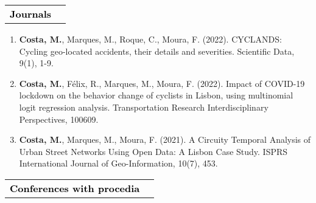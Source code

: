 \vspace{7pt}

\vspace{7pt}\hspace{-5pt}
\begin{tabular*}{1\textwidth}{p{} p{}}
        \textcolor{black}{\Large\textbf{Journals}} & \\
    \end{tabular*}
\begin{enumerate}[rightmargin=1.5cm]
\itemsep0em 
\item \textbf{Costa, M.}, Marques, M., Roque, C., Moura, F. (2022). CYCLANDS: Cycling geo-located accidents, their details and severities. Scientific Data, 9(1), 1-9.

\item \textbf{Costa, M.}, Félix, R., Marques, M., Moura, F. (2022). Impact of COVID-19 lockdown on the behavior change of cyclists in Lisbon, using multinomial logit regression analysis. Transportation Research Interdisciplinary Perspectives, 100609.

\item \textbf{Costa, M.}, Marques, M., Moura, F. (2021). A Circuity Temporal Analysis of Urban Street Networks Using Open Data: A Lisbon Case Study. ISPRS International Journal of Geo-Information, 10(7), 453.

\end{enumerate}

\vspace{7pt}\hspace{-5pt}
\begin{tabular*}{1\textwidth}{p{} p{}}
        \textcolor{black}{\Large\textbf{Conferences with procedia}} & \\
    \end{tabular*}

